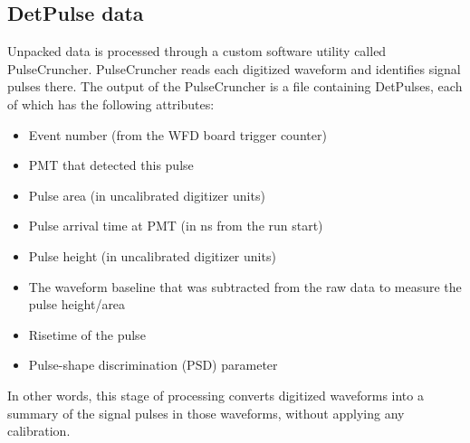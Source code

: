 \subsection{DetPulse data}
Unpacked data is processed through a custom software utility called PulseCruncher.
PulseCruncher reads each digitized waveform and identifies signal pulses there.
The output of the PulseCruncher is a file containing DetPulses, each of which has the following attributes:
\begin{itemize}
\item Event number (from the WFD board trigger counter)
\item PMT that detected this pulse
\item Pulse area (in uncalibrated digitizer units)
\item Pulse arrival time at PMT (in ns from the run start)
\item Pulse height (in uncalibrated digitizer units)
\item The waveform baseline that was subtracted from the raw data to measure the pulse height/area
\item Risetime of the pulse
\item Pulse-shape discrimination (PSD) parameter
\end{itemize}

In other words, this stage of processing converts digitized waveforms into a summary of the signal pulses in those waveforms, without applying any calibration.

